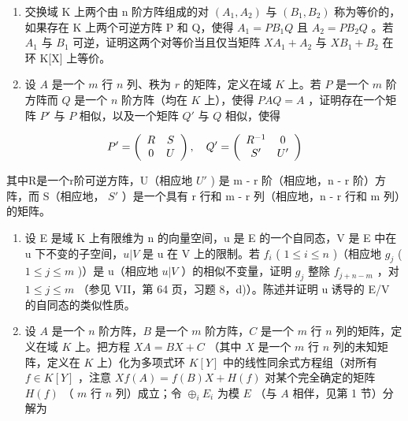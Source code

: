 \begin{enumerate}
\def\labelenumi{\arabic{enumi})}
\setcounter{enumi}{5}
\item
  交换域 K 上两个由 n 阶方阵组成的对 \((A_{1}, A_{2})\) 与 \((B_{1}, B_{2})\) 称为等价的，如果存在 K 上两个可逆方阵 P 和 Q，使得 \(A_{1} = PB_{1}Q\) 且 \(A_{2} = PB_{2}Q\) 。若 \(A_{1}\) 与 \(B_{1}\) 可逆，证明这两个对等价当且仅当矩阵 \(XA_{1} + A_{2}\) 与 \(XB_{1} + B_{2}\) 在环 K{[}X{]} 上等价。
\item
  设 \(A\) 是一个 \(m\) 行 \(n\) 列、秩为 \(r\) 的矩阵，定义在域 \(K\) 上。若 \(P\) 是一个 \(m\) 阶方阵而 \(Q\) 是一个 \(n\) 阶方阵（均在 \(K\) 上），使得 \(PAQ = A\) ，证明存在一个矩阵 \(P'\) 与 \(P\) 相似，以及一个矩阵 \(Q'\) 与 \(Q\) 相似，使得
\end{enumerate}

\[
P ^ {\prime} = \left( \begin{array}{c c} R & S \\ 0 & U \end{array} \right), \quad Q ^ {\prime} = \left( \begin{array}{c c} R ^ {- 1} & 0 \\ S ^ {\prime} & U ^ {\prime} \end{array} \right)
\]

其中R是一个r阶可逆方阵，U（相应地 \(U'\) ) 是 m - r 阶（相应地，n - r 阶）方阵，而 S（相应地， \(S'\) ）是一个具有 r 行和 m - r 列（相应地，n - r 行和 m 列）的矩阵。

\begin{enumerate}
\def\labelenumi{\arabic{enumi})}
\setcounter{enumi}{7}
\item
  设 E 是域 K 上有限维为 n 的向量空间，u 是 E 的一个自同态，V 是 E 中在 u 下不变的子空间，\(u|V\) 是 u 在 V 上的限制。若 \(f_{i}\) ( \(1 \leqslant i \leqslant n\) )（相应地 \(g_{j}\) ( \(1 \leqslant j \leqslant m\) )）是 u（相应地 \(u|V\) ）的相似不变量，证明 \(g_{j}\) 整除 \(f_{j+n-m}\) ，对 \(1 \leqslant j \leqslant m\) （参见 VII，第 64 页，习题 8，d)）。陈述并证明 u 诱导的 E/V 的自同态的类似性质。
\item
  设 \(A\) 是一个 \(n\) 阶方阵，\(B\) 是一个 \(m\) 阶方阵，\(C\) 是一个 \(m\) 行 \(n\) 列的矩阵，定义在域 \(K\) 上。把方程 \(X A = B X + C\) （其中 \(X\) 是一个 \(m\) 行 \(n\) 列的未知矩阵，定义在 \(K\) 上）化为多项式环 \(K[Y]\) 中的线性同余式方程组（对所有 \(f \in K[Y]\) ，注意 \(X f(A) = f(B)X + H(f)\) 对某个完全确定的矩阵 \(H(f)\) （ \(m\) 行 \(n\) 列）成立；令 \(\oplus_{i} E_i\) 为模 \(E\) （与 \(A\) 相伴，见第 1 节）分解为
\end{enumerate}

